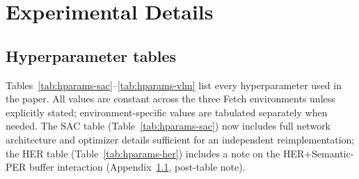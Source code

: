 \section{Experimental Details}
\label{app:experiments}

\subsection{Hyperparameter tables}
\label{app:hparams}

Tables~\ref{tab:hparams-sac}--\ref{tab:hparams-vlm} list every
hyperparameter used in the paper. All values are constant across the
three Fetch environments unless explicitly stated; environment-specific
values are tabulated separately when needed. The SAC table
(Table~\ref{tab:hparams-sac}) now includes full network architecture
and optimizer details sufficient for an independent reimplementation; the
HER table (Table~\ref{tab:hparams-her}) includes a note on the
HER$+$Semantic-PER buffer interaction (Appendix~\ref{app:hparams},
post-table note).

